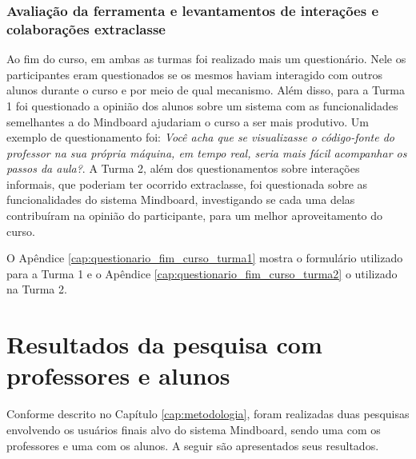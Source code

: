 \subsection{Avaliação da ferramenta e levantamentos de interações e colaborações extraclasse}

Ao fim do curso, em ambas as turmas foi realizado mais um questionário. Nele os participantes eram questionados se os mesmos haviam interagido com outros alunos durante o curso e por meio de qual mecanismo. Além disso, para a Turma 1 foi questionado a opinião dos alunos sobre um sistema com as funcionalidades semelhantes a do Mindboard ajudariam o curso a ser mais produtivo. Um exemplo de questionamento foi: \emph{Você acha que se visualizasse o código-fonte do professor na sua própria máquina, em tempo real, seria mais fácil acompanhar os passos da aula?}. A Turma 2, além dos questionamentos sobre interações informais, que poderiam ter ocorrido extraclasse, foi questionada sobre as funcionalidades do sistema Mindboard, investigando se cada uma delas contribuíram na opinião do participante, para um melhor aproveitamento do curso.

O Apêndice \ref{cap:questionario_fim_curso_turma1} mostra o formulário utilizado para a Turma 1 e o Apêndice \ref{cap:questionario_fim_curso_turma2} o utilizado na Turma 2.






\chapter{Resultados da pesquisa com professores e alunos}
\label{cap:resultados_pesquisa_professores_alunos}

Conforme descrito no Capítulo \ref{cap:metodologia}, foram realizadas duas pesquisas envolvendo os usuários finais alvo do sistema Mindboard, sendo uma com os professores e uma com os alunos. A seguir são apresentados seus resultados.




